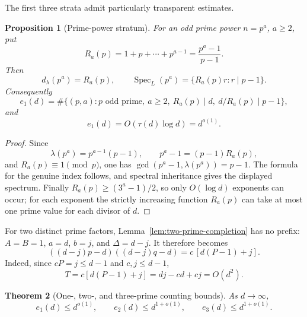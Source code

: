 \documentclass[11pt]{article}
\newtheorem{theorem}{Theorem}[section]
\newtheorem{proposition}[theorem]{Proposition}
\newcommand{\Spec}{\operatorname{Spec}}
\begin{document}
The first three strata admit particularly transparent estimates.

\begin{proposition}[Prime-power stratum]
\label{prop:e1-bound}
For an odd prime power $n=p^a$, $a\ge2$, put
\[
R_a(p)=1+p+\cdots+p^{a-1}=\frac{p^a-1}{p-1}.
\]
Then
\[
d_\lambda(p^a)=R_a(p),
\qquad
\Spec_L(p^a)=\{R_a(p)r:r\mid p-1\}.
\]
Consequently
\[
e_1(d)=
\#\{(p,a):p\text{ odd prime},\ a\ge2,
\ R_a(p)\mid d,\ d/R_a(p)\mid p-1\},
\]
and
\[
\boxed{e_1(d)=O(\tau(d)\log d)=d^{o(1)}.}
\]
\end{proposition}

\begin{proof}
Since
\[
\lambda(p^a)=p^{a-1}(p-1),
\qquad
p^a-1=(p-1)R_a(p),
\]
and $R_a(p)\equiv1\pmod p$, one has
$\gcd(p^a-1,\lambda(p^a))=p-1$.  The formula for the genuine index follows,
and spectral inheritance gives the displayed spectrum.  Finally
$R_a(p)\ge(3^a-1)/2$, so only $O(\log d)$ exponents can occur; for each
exponent the strictly increasing function $R_a(p)$ can take at most one
prime value for each divisor of $d$.
\end{proof}

For two distinct prime factors, Lemma~\ref{lem:two-prime-completion} has no
prefix: $A=B=1$, $a=d$, $b=j$, and $\Delta=d-j$.  It therefore becomes
\begin{equation}
\boxed{
((d-j)p-d)((d-j)q-d)
=c\,[d(P-1)+j].
}
\label{eq:two-prime-special}
\end{equation}
Indeed, since $cP=j\le d-1$ and $c,j\le d-1$,
\[
T=c[d(P-1)+j]=dj-cd+cj=O(d^2).
\]

\begin{theorem}[One-, two-, and three-prime counting bounds]
\label{thm:low-omega-counts}
As $d\to\infty$,
\[
\boxed{
e_1(d)\le d^{o(1)},
\qquad
e_2(d)\le d^{1+o(1)},
\qquad
e_3(d)\le d^{1+o(1)}.
}
\]
\end{theorem}
\end{document}
